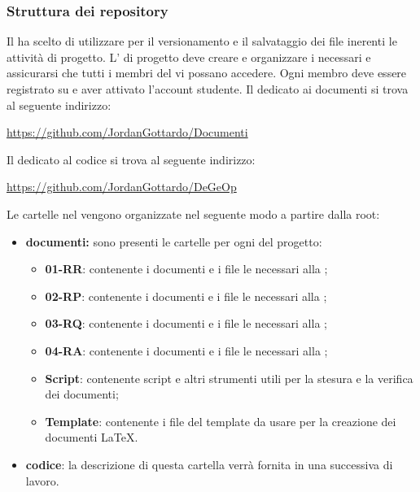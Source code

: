         \subsubsection{Struttura dei repository}
        Il  ha scelto di utilizzare  per il versionamento e il salvataggio dei file inerenti le attività di progetto. L'\amministratore{} di progetto deve creare e organizzare i  necessari e assicurarsi che tutti i membri del  vi possano accedere. Ogni membro deve essere registrato su  e aver attivato l'account studente.
        \newline \newline
        Il  dedicato ai documenti si trova al seguente indirizzo:
        \begin{center}
        	\url{https://github.com/JordanGottardo/Documenti}
        \end{center}
        Il  dedicato al codice si trova al seguente indirizzo:
        \begin{center}
        	\url{https://github.com/JordanGottardo/DeGeOp}
        \end{center}
        Le cartelle nel  vengono organizzate nel seguente modo a partire dalla root:
        \begin{itemize}
        	\item \textbf{documenti:} sono presenti le cartelle per ogni  del progetto:
	        \begin{itemize}
	        	\item \textbf{01-RR}: contenente i documenti e i file le necessari alla \revereq;
	        	\item \textbf{02-RP}: contenente i documenti e i file le necessari alla \revprog;
	        	\item \textbf{03-RQ}: contenente i documenti e i file le necessari alla \revaqual;
		        \item \textbf{04-RA}: contenente i documenti e i file le necessari alla \revacc;
                \item \textbf{Script}: contenente script e altri strumenti utili per la stesura e la verifica dei documenti;
		        \item \textbf{Template}: contenente i file del template da usare per la creazione dei documenti \LaTeX.
	        \end{itemize}
	        \item \textbf{codice}: la descrizione di questa cartella verrà fornita in una  successiva di lavoro.
        \end{itemize}
